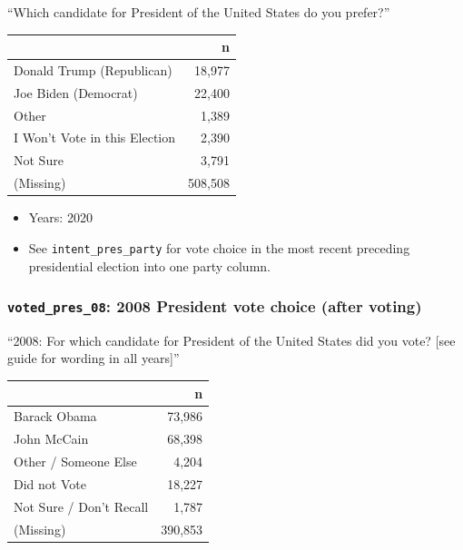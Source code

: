 \documentclass[10pt,article,oneside]{memoir}
\theoremstyle{definition}
\begin{document}
``Which candidate for President of the United States do you prefer?''

\begin{table}[H]
\centering
\begin{tabular}[t]{lr}
\toprule
 & n\\
\midrule
Donald Trump (Republican) & 18,977\\
Joe Biden (Democrat) & 22,400\\
Other & 1,389\\
I Won't Vote in this Election & 2,390\\
Not Sure & 3,791\\
(Missing) & 508,508\\
\bottomrule
\end{tabular}
\end{table}

\begin{itemize}
\tightlist
\item
  Years: 2020
\item
  See \texttt{intent\_pres\_party} for vote choice in the most recent
  preceding presidential election into one party column.
\end{itemize}

\hypertarget{voted_pres_08-2008-president-vote-choice-after-voting}{%
\subsubsection{\texorpdfstring{\texttt{voted\_pres\_08}: 2008 President
vote choice (after
voting)}{voted\_pres\_08: 2008 President vote choice (after voting)}}\label{voted_pres_08-2008-president-vote-choice-after-voting}}

``2008: For which candidate for President of the United States did you
vote? {[}see guide for wording in all years{]}''

\begin{table}[H]
\centering
\begin{tabular}[t]{lr}
\toprule
 & n\\
\midrule
Barack Obama & 73,986\\
John McCain & 68,398\\
Other / Someone Else & 4,204\\
Did not Vote & 18,227\\
Not Sure / Don't Recall & 1,787\\
(Missing) & 390,853\\
\bottomrule
\end{tabular}
\end{table}
\end{document}
